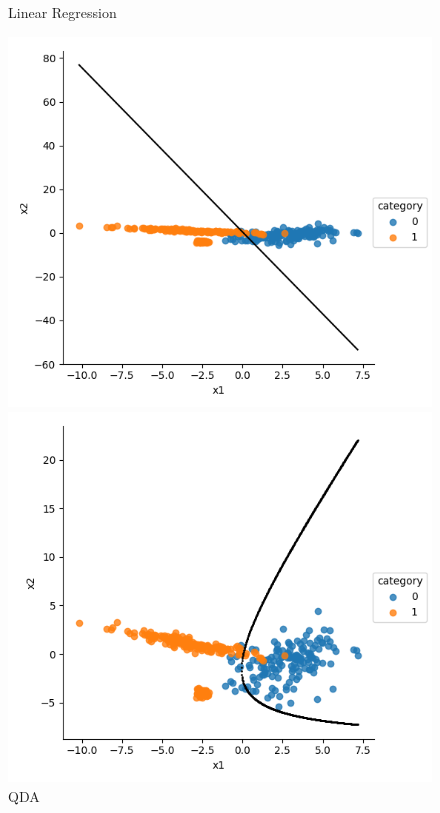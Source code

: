 \documentclass[a4paper]{article}
\begin{document}
\begin{figure}[h]
\begin{minipage}{0,45\textwidth}
\end{minipage}
\begin{minipage}{0,45\textwidth}
\caption{Linear Regression}
\includegraphics[scale=.5]{c_lr.png}
\end{minipage}
\begin{minipage}{0,45\textwidth}
\caption{QDA}
\includegraphics[scale=.5]{c_qda.png}
\end{minipage}
\end{figure}
\end{document}
